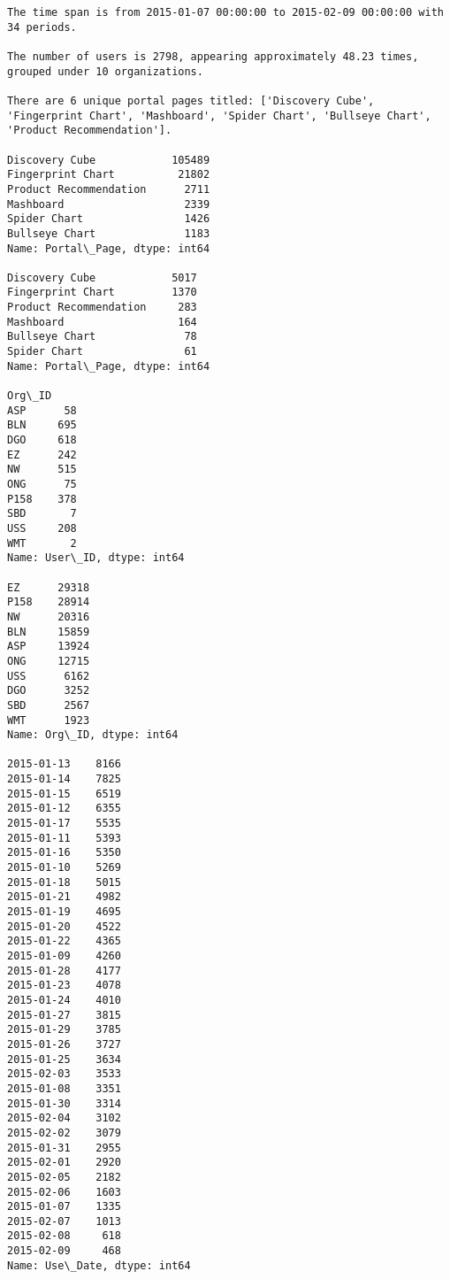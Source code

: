 \documentclass[11pt]{article}
\begin{document}
    \begin{Verbatim}[commandchars=\\\{\}]
The time span is from 2015-01-07 00:00:00 to 2015-02-09 00:00:00 with 34 periods.

The number of users is 2798, appearing approximately 48.23 times, grouped under 10 organizations.

There are 6 unique portal pages titled: ['Discovery Cube', 'Fingerprint Chart', 'Mashboard', 'Spider Chart', 'Bullseye Chart', 'Product Recommendation'].

Discovery Cube            105489
Fingerprint Chart          21802
Product Recommendation      2711
Mashboard                   2339
Spider Chart                1426
Bullseye Chart              1183
Name: Portal\_Page, dtype: int64

Discovery Cube            5017
Fingerprint Chart         1370
Product Recommendation     283
Mashboard                  164
Bullseye Chart              78
Spider Chart                61
Name: Portal\_Page, dtype: int64

Org\_ID
ASP      58
BLN     695
DGO     618
EZ      242
NW      515
ONG      75
P158    378
SBD       7
USS     208
WMT       2
Name: User\_ID, dtype: int64

EZ      29318
P158    28914
NW      20316
BLN     15859
ASP     13924
ONG     12715
USS      6162
DGO      3252
SBD      2567
WMT      1923
Name: Org\_ID, dtype: int64

2015-01-13    8166
2015-01-14    7825
2015-01-15    6519
2015-01-12    6355
2015-01-17    5535
2015-01-11    5393
2015-01-16    5350
2015-01-10    5269
2015-01-18    5015
2015-01-21    4982
2015-01-19    4695
2015-01-20    4522
2015-01-22    4365
2015-01-09    4260
2015-01-28    4177
2015-01-23    4078
2015-01-24    4010
2015-01-27    3815
2015-01-29    3785
2015-01-26    3727
2015-01-25    3634
2015-02-03    3533
2015-01-08    3351
2015-01-30    3314
2015-02-04    3102
2015-02-02    3079
2015-01-31    2955
2015-02-01    2920
2015-02-05    2182
2015-02-06    1603
2015-01-07    1335
2015-02-07    1013
2015-02-08     618
2015-02-09     468
Name: Use\_Date, dtype: int64


    \end{Verbatim}
\end{document}
